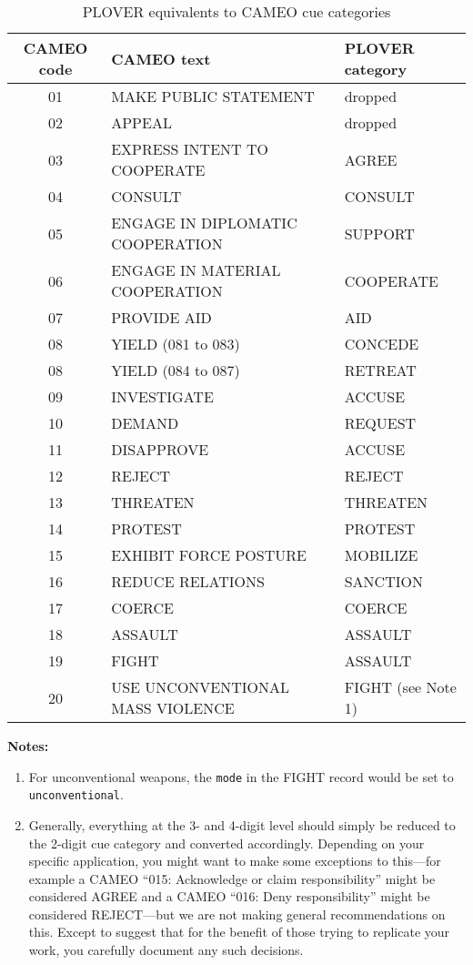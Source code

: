 \documentclass[11pt]{report}
\newcommand{\plcat}[1]{\textsf{#1}}
\newcommand{\plmod}[1]{\texttt{#1}}
\newcommand{\txt}[1]{\texttt{#1}}
\begin{document}
{\begin{table}[htp]
\caption{PLOVER equivalents to CAMEO cue categories}
\begin{center}
\begin{tabular}{|c|l|l|}
\hline
CAMEO code & CAMEO text & PLOVER category \\
\hline
01 & MAKE PUBLIC STATEMENT & dropped \\
02 & APPEAL & dropped \\
03 & EXPRESS INTENT TO COOPERATE & AGREE \\
04 & CONSULT & CONSULT \\
05 & ENGAGE IN DIPLOMATIC COOPERATION & SUPPORT \\
06 & ENGAGE IN MATERIAL COOPERATION & COOPERATE \\
07 & PROVIDE AID & AID \\
08 & YIELD (081 to 083) & CONCEDE \\
08 & YIELD (084 to 087) & RETREAT \\
09 & INVESTIGATE & ACCUSE \\
10 & DEMAND & REQUEST \\
11 & DISAPPROVE & ACCUSE \\
12 & REJECT & REJECT \\
13 & THREATEN & THREATEN \\
14 & PROTEST & PROTEST \\
15& EXHIBIT FORCE POSTURE & MOBILIZE \\
16 & REDUCE RELATIONS & SANCTION \\
17 & COERCE & COERCE \\
18 & ASSAULT & ASSAULT \\
19 & FIGHT & ASSAULT \\
20 & USE UNCONVENTIONAL MASS VIOLENCE & FIGHT (see Note 1) \\
\hline

\end{tabular}
\end{center}
\label{tab:xlate}
\end{table}%

\noindent \textbf{Notes:}

\begin{enumerate}
\item For unconventional weapons, the  \txt{mode} in the \plcat{FIGHT} record would be set to \plmod{unconventional}. \item Generally, everything at the 3- and 4-digit level should simply be reduced to the 2-digit cue category and converted accordingly. Depending on your specific application, you might want to make some exceptions to this---for example a CAMEO  ``015: Acknowledge or claim responsibility'' might be considered \plcat{AGREE} and a CAMEO ``016: Deny responsibility'' might be considered REJECT---but we are not making general recommendations on this. Except to suggest that for the benefit of those trying to replicate your work, you carefully document any such decisions.
\end{enumerate}


}
\end{document}
